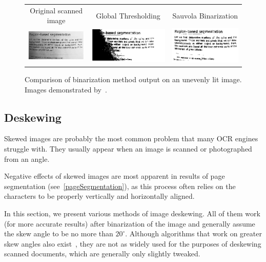 \begin{figure}
\centering
{\sffamily
\begin{tabular}{ccc}
Original scanned image &
Global Thresholding &
Sauvola Binarization \\
\includegraphics[width=.3\linewidth]{img/preprocessing/bin_orig.png} &
\includegraphics[width=.3\linewidth]{img/preprocessing/bin_glob.png} &
\includegraphics[width=.3\linewidth]{img/preprocessing/bin_sauvola.png}
\end{tabular}
}
\caption{Comparison of binarization method output on an unevenly lit image. Images demonstrated by~\citet{binarizationComp}.}
\label{fig:preprocessBinarization}
\end{figure}

\subsection{Deskewing} \label{deskewing}

Skewed images are probably the most common problem that many OCR engines struggle with. They usually appear when an image is scanned or photographed from an angle.

Negative effects of skewed images are most apparent in results of page segmentation (see~\cref{pageSegmentation}), as this process often relies on the characters to be properly vertically and horizontally aligned.

In this section, we present various methods of image deskewing. All of them work (for more accurate results) after binarization of the image and generally assume the skew angle to be no more than $20^{\circ}$. Although algorithms that work on greater skew angles also exist~\citep{skewAngleDetection}, they are not as widely used for the purposes of deskewing scanned documents, which are generally only slightly tweaked.

